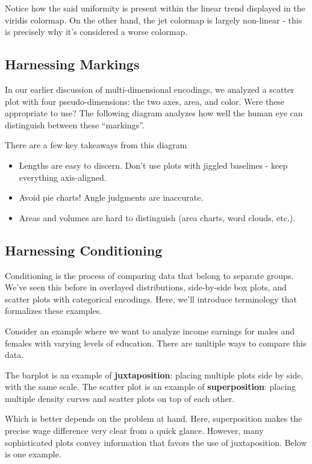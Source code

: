 \documentclass[
  letterpaper,
  DIV=11,
  numbers=noendperiod]{scrreprt}
\providecommand{\tightlist}{%
  \setlength{\itemsep}{0pt}\setlength{\parskip}{0pt}}\usepackage{longtable,booktabs,array}
\begin{document}
Notice how the said uniformity is present within the linear trend
displayed in the viridis colormap. On the other hand, the jet colormap
is largely non-linear - this is precisely why it's considered a worse
colormap.

\subsection{Harnessing Markings}\label{harnessing-markings}

In our earlier discussion of multi-dimensional encodings, we analyzed a
scatter plot with four pseudo-dimensions: the two axes, area, and color.
Were these appropriate to use? The following diagram analyzes how well
the human eye can distinguish between these ``markings''.

There are a few key takeaways from this diagram

\begin{itemize}
\tightlist
\item
  Lengths are easy to discern. Don't use plots with jiggled baselines -
  keep everything axis-aligned.
\item
  Avoid pie charts! Angle judgments are inaccurate.
\item
  Areas and volumes are hard to distinguish (area charts, word clouds,
  etc.).
\end{itemize}

\subsection{Harnessing Conditioning}\label{harnessing-conditioning}

Conditioning is the process of comparing data that belong to separate
groups. We've seen this before in overlayed distributions, side-by-side
box plots, and scatter plots with categorical encodings. Here, we'll
introduce terminology that formalizes these examples.

Consider an example where we want to analyze income earnings for males
and females with varying levels of education. There are multiple ways to
compare this data.

The barplot is an example of \textbf{juxtaposition}: placing multiple
plots side by side, with the same scale. The scatter plot is an example
of \textbf{superposition}: placing multiple density curves and scatter
plots on top of each other.

Which is better depends on the problem at hand. Here, superposition
makes the precise wage difference very clear from a quick glance.
However, many sophisticated plots convey information that favors the use
of juxtaposition. Below is one example.
\end{document}
